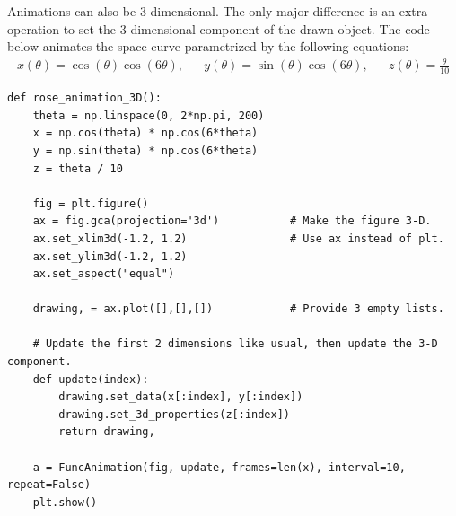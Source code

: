 Animations can also be 3-dimensional.
The only major difference is an extra operation to set the 3-dimensional component of the drawn object.
The code below animates the space curve parametrized by the following equations:
%
\[\begin{array}{ccccc}
x(\theta) = \cos(\theta)\cos(6\theta), &&
y(\theta) = \sin(\theta)\cos(6\theta), &&
z(\theta) = \frac{\theta}{10}
\end{array}\]

\begin{lstlisting}
def rose_animation_3D():
    theta = np.linspace(0, 2*np.pi, 200)
    x = np.cos(theta) * np.cos(6*theta)
    y = np.sin(theta) * np.cos(6*theta)
    z = theta / 10

    fig = plt.figure()
    ax = fig.gca(projection='3d')           # Make the figure 3-D.
    ax.set_xlim3d(-1.2, 1.2)                # Use ax instead of plt.
    ax.set_ylim3d(-1.2, 1.2)
    ax.set_aspect("equal")

    drawing, = ax.plot([],[],[])            # Provide 3 empty lists.

    # Update the first 2 dimensions like usual, then update the 3-D component.
    def update(index):
        drawing.set_data(x[:index], y[:index])
        drawing.set_3d_properties(z[:index])
        return drawing,

    a = FuncAnimation(fig, update, frames=len(x), interval=10, repeat=False)
    plt.show()
\end{lstlisting}


